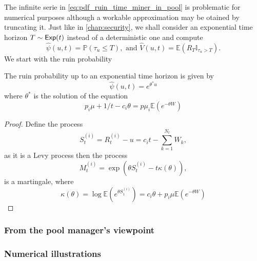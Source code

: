\noindent The infinite serie in \eqref{eq:pdf_ruin_time_miner_in_pool} is problematic for numerical purposes although a workable approximation may be otained by truncating it. Just like in \cref{chap:security}, we shall consider an exponential time horizon $T\sim\mathsf{Exp}(t)$ instead of a deterministic one and compute
\[
\widehat{\psi}(u,t) = \mathbb{P}(\tau_u \leq T),\text{ and }\widehat{V}(u,t) = \mathbb{E}(R_T\mathbb{I}_{\tau_u > T}).
\]
We start with the ruin probability
\begin{prop}\label{prop:rp_hat_miner_in_pool}
The ruin probability up to an exponential time horizon is given by 
\[
\widehat{\psi}(u,t) = e^{\theta^{\ast} u}
\]
where $\theta^{\ast}$ is the solution of the equation
\[
p_i\mu + 1/t - c_i \theta = p\mu_i\mathbb{E}\left(e^{-\theta W}\right)
\]
\end{prop}
\begin{proof}
Define the process
\[
S_t^{(i)} = R^{(i)}_t-u =c_i t-\sum_{k = 1}^{N_t}W_k,
\]
as it is a Levy process then the process
\[
M_t^{(i)}=\exp\left(\theta S_t^{(i)} - t\kappa(\theta)\right),
\]
is a martingale, where 
\[
\kappa(\theta) =\log \mathbb{E}(e^{\theta S_1^{(i)}}) = c_i\theta + p_i\mu \mathbb{E}\left(e^{-\theta W}\right)
\]

\end{proof}

\subsubsection{From the pool manager's viewpoint}\label{ssec:manager_viewpoint}
\subsubsection{Numerical illustrations}\label{ssec:numerical_illustrations}

\newpage